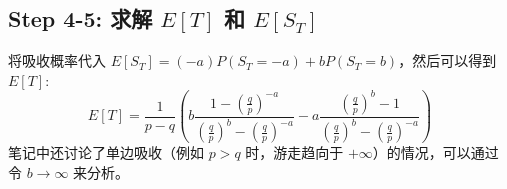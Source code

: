 \documentclass[12pt, a4paper, oneside, fontset=windows]{ctexbook}
\begin{document}
\subsection{Step 4-5: 求解 $E[T]$ 和 $E[S_T]$}
将吸收概率代入 $E[S_T] = (-a)P(S_T=-a) + b P(S_T=b)$，然后可以得到 $E[T]$:
\[ E[T] = \frac{1}{p-q} \left( b \frac{1 - (\frac{q}{p})^{-a}}{(\frac{q}{p})^b - (\frac{q}{p})^{-a}} - a \frac{(\frac{q}{p})^b - 1}{(\frac{q}{p})^b - (\frac{q}{p})^{-a}} \right) \]
笔记中还讨论了单边吸收（例如 $p>q$ 时，游走趋向于 $+\infty$）的情况，可以通过令 $b \to \infty$ 来分析。

\vspace{2em}
\vspace{1em}
\end{document}

